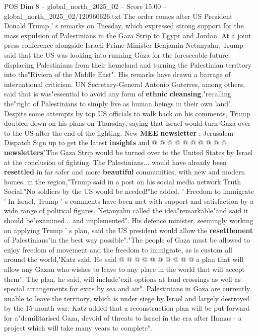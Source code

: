 \begin{textsample}{POS Dim 8 – global\_north\_2025\_02 – Score 15.00 – global\_north\_2025\_02/120960626.txt}  \label{ex:f8_pos_004}
The order comes after US President Donald Trump ' s remarks on Tuesday, which expressed strong support for the mass expulsion of Palestinians in the Gaza Strip to Egypt and Jordan.
At a joint press conference alongside Israeli Prime Minister Benjamin Netanyahu, Trump said that the US was looking into running Gaza for the foreseeable future, displacing Palestinians from their homeland and turning the Palestinian territory into the"Riviera of the Middle East".
His remarks have drawn a barrage of international criticism.
UN Secretary-General Antonio Guterres, among others, said that is was"essential to avoid any form of \textbf{ethnic} \textbf{cleansing},"recalling the"right of Palestinians to simply live as human beings in their own land".
Despite some attempts by top US officials to walk back on his comments, Trump doubled down on his plans on Thursday, saying that Israel would turn Gaza over to the US after the end of the fighting.
New \textbf{MEE} \textbf{newsletter} : Jerusalem Dispatch Sign up to get the latest \textbf{insights} and @ @ @ @ @ @ @ @ @ @ \textbf{newsletters}"The Gaza Strip would be turned over to the United States by Israel at the conclusion of fighting.
The Palestinians... would have already been \textbf{resettled} in far safer and more \textbf{beautiful} communities, with new and modern homes, in the region,"Trump said in a post on his social media network Truth Social."No soldiers by the US would be needed!"he added. ' Freedom to immigrate ' In Israel, Trump ' s comments have been met with support and satisfaction by a wide range of political figures.
Netanyahu called the idea"remarkable"and said it should be"examined... and implemented".
His defence minister, seemingly working on applying Trump ' s plan, said the US president would allow the \textbf{resettlement} of Palestinians"in the best way possible"."The people of Gaza must be allowed to enjoy freedom of movement and the freedom to immigrate, as is custom all around the world,"Katz said.
He said @ @ @ @ @ @ @ @ @ @ a plan that will allow any Gazan who wishes to leave to any place in the world that will accept them".
The plan, he said, will include"exit options at land crossings as well as special arrangements for exits by sea and air".
Palestinians in Gaza are currently unable to leave the territory, which is under siege by Israel and largely destroyed by the 15-month war.
Katz added that a reconstruction plan will be put forward for a"demilitarised Gaza, devoid of threats to Israel in the era after Hamas - a project which will take many years to complete".

\end{textsample}
